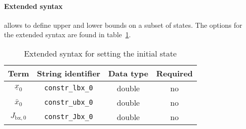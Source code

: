 \documentclass[english]{article}
\newcommand{\code}[1]{\texttt{#1}}
\newcommand{\optional}{no}
\begin{document}
\paragraph{Extended syntax}
allows to define upper and lower bounds on a subset of states.
The options for the extended syntax are found in table~\ref{tab:constraints:extendedsyntax}.
\begin{table}[ht!]
    \centering
    \caption{Extended syntax for setting the initial state} \label{tab:constraints:extendedsyntax}
    \begin{tabular}{cccc}
        \toprule
        Term & String identifier & Data type & Required \\ \midrule
        $ \underline{x}_0 $ & \code{constr\_lbx\_0} & double & \optional \\
        $ \bar{x}_0 $ & \code{constr\_ubx\_0} & double & \optional \\
        $ J_{\textrm{bx},0} $ & \code{constr\_Jbx\_0} & double & \optional \\
        \bottomrule
    \end{tabular}
\end{table}
%
\end{document}

